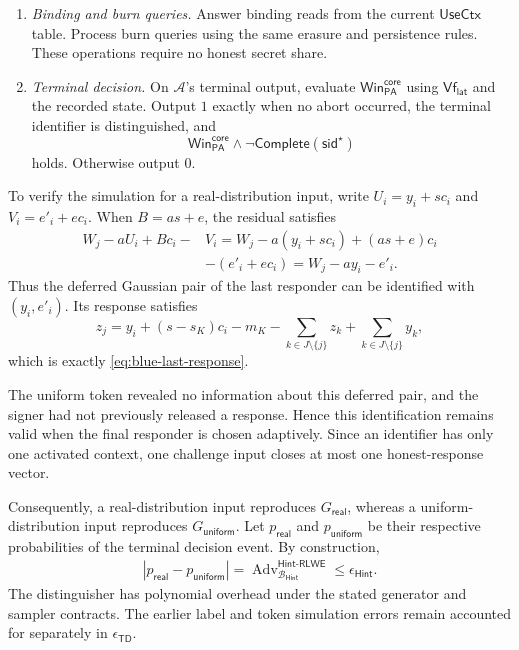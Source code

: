 \documentclass[lettersize,journal]{IEEEtran}
\begin{document}
\begin{enumerate}
		\item \emph{Binding and burn queries.}
		Answer binding reads from the current $\mathsf{UseCtx}$ table.
		Process burn queries using the same erasure and persistence rules.
		These operations require no honest secret share.
		
		\item \emph{Terminal decision.}
		On $\mathcal A$'s terminal output, evaluate
		$\mathsf{Win}_{\mathsf{PA}}^{\mathsf{core}}$
		using $\mathsf{Vf}_{\mathsf{lat}}$ and the recorded state.
		Output $1$ exactly when no abort occurred,
		the terminal identifier is distinguished, and
		\[
		\mathsf{Win}_{\mathsf{PA}}^{\mathsf{core}}
		\wedge
		\neg\mathsf{Complete}(\mathsf{sid}^{\star})
		\]
		holds.
		Otherwise output $0$.
	\end{enumerate}
	
	To verify the simulation for a real-distribution input,
	write $U_i=y_i+sc_i$ and $V_i=e'_i+ec_i$.
	When $B=as+e$, the residual satisfies
	\[
	\begin{aligned}
		W_j-aU_i+Bc_i-&V_i
		=W_j-a(y_i+sc_i)+(as+e)c_i\\
		&-(e'_i+ec_i) =W_j-ay_i-e'_i.
	\end{aligned}
	\]
	Thus the deferred Gaussian pair of the last responder
	can be identified with $(y_i,e'_i)$.
	Its response satisfies
	\[
	z_j
	=y_i+(s-s_K)c_i-m_K
	-\sum_{k\in J\setminus\{j\}}z_k
	+\sum_{k\in J\setminus\{j\}}y_k,
	\]
	which is exactly \eqref{eq:blue-last-response}.
	
	The uniform token revealed no information about this deferred pair,
	and the signer had not previously released a response.
	Hence this identification remains valid when the final responder
	is chosen adaptively.
	Since an identifier has only one activated context,
	one challenge input closes at most one honest-response vector.
	
	Consequently, a real-distribution input reproduces
	$G_{\mathsf{real}}$, whereas a uniform-distribution input
	reproduces $G_{\mathsf{uniform}}$.
	Let $p_{\mathsf{real}}$ and $p_{\mathsf{uniform}}$
	be their respective probabilities of the terminal decision event.
	By construction,
	\[
	\begin{aligned}
		|p_{\mathsf{real}}-p_{\mathsf{uniform}}|
		=
		\operatorname{Adv}^{\mathsf{Hint\text{-}RLWE}}
		_{\mathcal B_{\mathsf{Hint}}} \leq \epsilon_{\mathsf{Hint}}.
	\end{aligned}
	\]
	The distinguisher has polynomial overhead under the stated
	generator and sampler contracts.
	The earlier label and token simulation errors remain
	accounted for separately in $\epsilon_{\mathsf{TD}}$.
	
\end{document}
